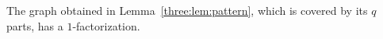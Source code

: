 \begin{proposition}\label{three:prop:terminal}
The graph obtained in Lemma~\ref{three:lem:pattern}, which is covered
by its $q$ parts, has a $1$-factorization.
\end{proposition}